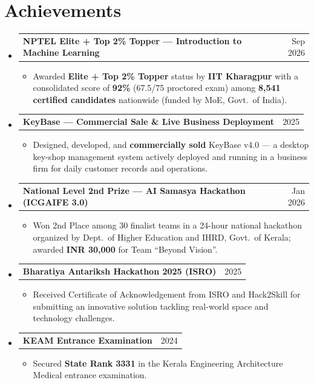 \documentclass[a4paper,10pt]{article}
\makeatletter
\newcommand{\resumeItem}[1]{
  \item\small{
    {#1 \vspace{-2pt}}
  }
}
\newcommand{\resumeProjectHeading}[2]{
    \item
    \begin{tabular*}{0.97\textwidth}{l@{\extracolsep{\fill}}r}
      \small#1 & #2 \\
    \end{tabular*}\vspace{-7pt}
}
\newcommand{\resumeSubHeadingListStart}{\begin{itemize}[leftmargin=0.15in, label={}]}
\newcommand{\resumeSubHeadingListEnd}{\end{itemize}}
\newcommand{\resumeItemListStart}{\begin{itemize}}
\newcommand{\resumeItemListEnd}{\end{itemize}\vspace{-5pt}}
\makeatother
\begin{document}
\section{Achievements}
  \resumeSubHeadingListStart
    \resumeProjectHeading{\textbf{NPTEL Elite + Top 2\% Topper --- Introduction to Machine Learning}}{Sep 2026}
    \resumeItemListStart
      \resumeItem{Awarded \textbf{Elite + Top 2\% Topper} status by \textbf{IIT Kharagpur} with a consolidated score of \textbf{92\%} (67.5/75 proctored exam) among \textbf{8,541 certified candidates} nationwide (funded by MoE, Govt.\ of India).}
    \resumeItemListEnd
    \resumeProjectHeading{\textbf{KeyBase --- Commercial Sale \& Live Business Deployment}}{2025}
    \resumeItemListStart
      \resumeItem{Designed, developed, and \textbf{commercially sold} KeyBase v4.0 --- a desktop key-shop management system actively deployed and running in a business firm for daily customer records and operations.}
    \resumeItemListEnd
    \resumeProjectHeading{\textbf{National Level 2nd Prize --- AI Samasya Hackathon (ICGAIFE 3.0)}}{Jan 2026}
    \resumeItemListStart
      \resumeItem{Won 2nd Place among 30 finalist teams in a 24-hour national hackathon organized by Dept.\ of Higher Education and IHRD, Govt.\ of Kerala; awarded \textbf{INR 30,000} for Team ``Beyond Vision''.}
    \resumeItemListEnd
    \resumeProjectHeading{\textbf{Bharatiya Antariksh Hackathon 2025 (ISRO)}}{2025}
    \resumeItemListStart
      \resumeItem{Received Certificate of Acknowledgement from ISRO and Hack2Skill for submitting an innovative solution tackling real-world space and technology challenges.}
    \resumeItemListEnd
    \resumeProjectHeading{\textbf{KEAM Entrance Examination}}{2024}
    \resumeItemListStart
      \resumeItem{Secured \textbf{State Rank 3331} in the Kerala Engineering Architecture Medical entrance examination.}
    \resumeItemListEnd
  \resumeSubHeadingListEnd


\end{document}
